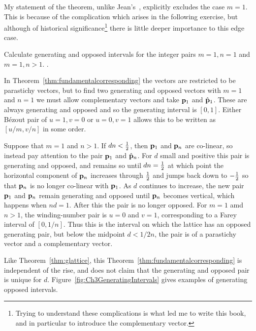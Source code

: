 My statement of the theorem, unlike Jean's~\autocite{jeanPhyllotaxisSystemicStudy1994}, explicitly excludes the case $m=1$. This is because of the complication which arises in the following exercise, but although of historical significance\footnote{Trying to understand these complications is what led me to write this book, and in particular to introduce the complementary vector.} there is little deeper importance to this edge case.

\begin{jExercise}
	Calculate generating and opposed intervals for the integer pairs $m=1,n=1$ and $m=1,n>1$.
	\label{ex:ftpfail}.
\end{jExercise}
\begin{jAnswer}
	
	In Theorem~\ref{thm:fundamentalcorresponding} the vectors are restricted to be parastichy vectors, but to find two generating and opposed vectors  with $m=1$ and $n=1$ we must allow complementary vectors and take ${\mathbf p}_{1}$ and $\hat{\mathbf p}_{1}$. 
	These are always generating and opposed and so the generating interval is $[0,1]$. 
	Either B\'ezout pair of $u=1, v=0$ or $u=0,v=1$ allows this to be written as $[u/m,v/n]$ in some order.
	
	Suppose that $m=1$ and $n>1$. If $dn<\textstyle{\frac{1}{2}}$, then ${\mathbf p}_{1}$ and ${\mathbf p}_{n}$ are co-linear, so instead pay attention to the pair ${\mathbf p}_{1}$ and $\hat{\mathbf p}_{n}$. For $d$ small and positive this pair is generating and opposed, and remains so until $dn=\textstyle{\frac{1}{2}}$ at which point the horizontal component of ${\mathbf p}_{n}$ increases through $\textstyle{\frac{1}{2}}$ and jumps back down to $-\textstyle{\frac{1}{2}}$ so that  ${\mathbf p}_{n}$ is no longer co-linear with ${\mathbf p}_{1}$. As $d$ continues to increase, the new pair ${\mathbf p}_{1}$ and ${\mathbf p}_{n}$ remain generating and opposed until
	 ${\mathbf p}_{n}$ becomes vertical, which happens when $nd=1$. After this the pair is no longer opposed.
	 	 For $m=1$ amd $n>1$, the winding-number pair is $u=0$ and $v=1$, corresponding to a Farey interval of $[0,1/n]$. Thus this is the interval on which the lattice has an opposed generating pair, but below the midpoint $d<1/2n$, the pair is of a parastichy vector and a complementary vector. 
	 

\end{jAnswer}

Like Theorem~\ref{thm:glattice}, this Theorem~\ref{thm:fundamentalcorresponding} is independent of the rise, and does not claim that the generating and opposed pair is unique for $d$. Figure~\ref{fig:Ch3GeneratingIntervals} gives examples of generating opposed intervals. %

